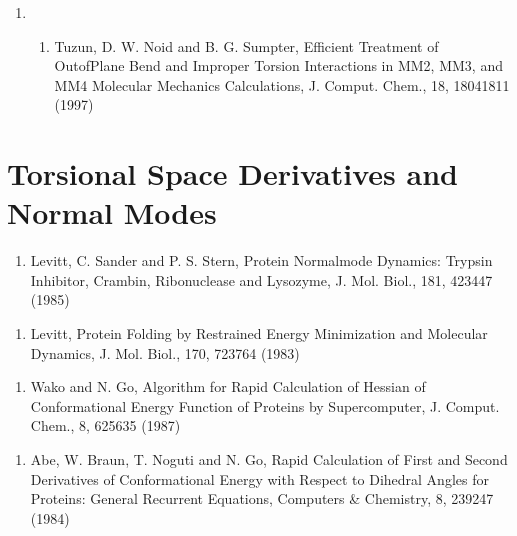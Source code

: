 \documentclass[letterpaper,11pt,english]{sphinxmanual}
\begin{document}
\begin{enumerate}
%
\setcounter{enumi}{17}
\item {} \begin{enumerate}
%
\setcounter{enumii}{4}
\item {} 
Tuzun, D. W. Noid and B. G. Sumpter, Efficient Treatment of Out\sphinxhyphen{}of\sphinxhyphen{}Plane Bend and Improper Torsion Interactions in MM2, MM3, and MM4 Molecular Mechanics Calculations, J. Comput. Chem., 18, 1804\sphinxhyphen{}1811 (1997)

\end{enumerate}

\end{enumerate}


\section{Torsional Space Derivatives and Normal Modes}
\label{\detokenize{text/references:torsional-space-derivatives-and-normal-modes}}\begin{enumerate}
%
\setcounter{enumi}{12}
\item {} 
Levitt, C. Sander and P. S. Stern, Protein Normal\sphinxhyphen{}mode Dynamics:  Trypsin Inhibitor, Crambin, Ribonuclease and Lysozyme, J. Mol. Biol., 181, 423\sphinxhyphen{}447 (1985)

\end{enumerate}
\begin{enumerate}
%
\setcounter{enumi}{12}
\item {} 
Levitt, Protein Folding by Restrained Energy Minimization and Molecular Dynamics, J. Mol. Biol., 170, 723\sphinxhyphen{}764 (1983)

\end{enumerate}
\begin{enumerate}
%
\setcounter{enumi}{7}
\item {} 
Wako and N. Go, Algorithm for Rapid Calculation of Hessian of Conformational Energy Function of Proteins by Supercomputer, J. Comput. Chem., 8, 625\sphinxhyphen{}635 (1987)

\end{enumerate}
\begin{enumerate}
%
\setcounter{enumi}{7}
\item {} 
Abe, W. Braun, T. Noguti and N. Go, Rapid Calculation of First and Second Derivatives of Conformational Energy with Respect to Dihedral Angles for Proteins: General Recurrent Equations, Computers \& Chemistry, 8, 239\sphinxhyphen{}247 (1984)

\end{enumerate}
\end{document}
